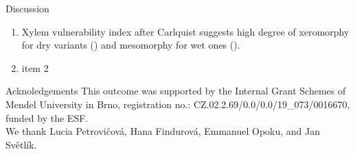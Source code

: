 \documentclass[final]{beamer}
\newlength{\sepwidth}
\newlength{\colwidth}
\newcommand{\separatorcolumn}{\begin{column}{\sepwidth}\end{column}}
\begin{document}
\begin{frame}[t]
\begin{columns}[t]
\begin{column}{\colwidth}
\end{column}
\end{columns}

\begin{columns}[c]
\begin{column}{0.96\paperwidth}

\begin{block}{Discussion}
    \begin{enumerate}
        \item Xylem vulnerability index after Carlquist suggests high degree of xeromorphy for dry variants () and mesomorphy for wet ones ().
        \item item 2
    \end{enumerate}

\footnotesize \printbibliography
\end{block}

\begin{block}{Acknoledgements}
\small \centering
    This outcome was supported by the Internal Grant Schemes of Mendel University in Brno, registration no.: CZ.02.2.69/0.0/0.0/19\_073/0016670, funded by the ESF. \\
    We thank Lucia Petrovičová, Hana Findurová, Emmanuel Opoku, and Jan Světlík.
\end{block}

\end{column}
%
%
\end{columns}
\end{frame}
\end{document}
